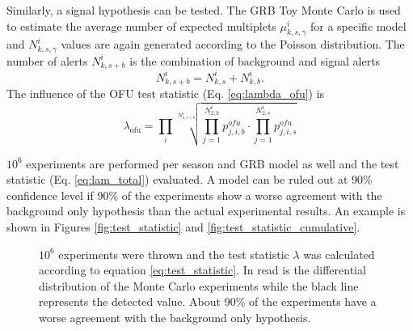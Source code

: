 Similarly, a signal hypothesis can be tested. The GRB Toy Monte Carlo is used 
to estimate the average number of expected multiplets $\mu_{k,s, \gamma}^i$ for 
a 
specific model and $N_{k,s, \gamma}^i$ values are again generated according to 
the 
Poisson  distribution. The number of alerts $N_{k,s+b}^i$ is the
combination of background and signal alerts
\begin{equation}
 N_{k,s+b}^i = N_{k,s}^i + N_{k,b}^i.
\end{equation}
The influence of the OFU test statistic (Eq. \ref{eq:lambda_ofu}) is 
\begin{equation}
 \lambda_\text{ofu} = \prod_i \sqrt[N_{2,s+b}^i]{\prod_{j=1}^{N_{2,b}^i} 
p_{j,i,b}^{ofu} \cdot \prod_{j=1}^{N_{2,s}^i}
p_{j,i,s}^{ofu}}
\end{equation}

$10^6$ experiments are performed per season and GRB 
model as well and the test statistic (Eq. \ref{eq:lam_total})
evaluated. A model can be ruled 
out at 90\% confidence level if 90\% of the experiments show a worse agreement 
with the background only hypothesis than the actual experimental results.
An example is shown in Figures \ref{fig:test_statistic} and 
\ref{fig:test_statistic_cumulative}.
\begin{figure}[h]
\centering
 \captionsetup{width=.9\textwidth}
\caption{$10^6$ experiments were thrown and the 
test statistic $\lambda$ was calculated according 
to equation \ref{eq:test_statistic}. In read is the differential
distribution of the Monte Carlo experiments while 
the black line represents the detected value. About 90\% of the experiments 
have a worse agreement with the background only hypothesis.}
\end{figure}

